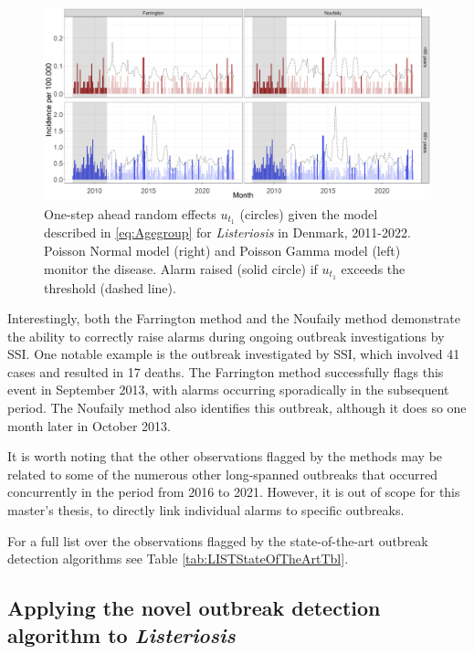 \documentclass[a4paper,twoside,11pt]{report} %
\theoremstyle{definition}
\theoremstyle{definition}
\theoremstyle{definition}
\theoremstyle{definition}
\theoremstyle{remark}
\begin{document}
\begin{figure}[H]
\includegraphics[width=1\linewidth]{../figures/Compare_stateOfTheArt_LIST} \caption{One-step ahead random effects \(u_{t_1}\) (circles) given the model described in \eqref{eq:Agegroup} for \textit{Listeriosis} in Denmark, 2011-2022. Poisson Normal model (right) and Poisson Gamma model (left) monitor the disease. Alarm raised (solid circle) if \(u_{t_1}\) exceeds the threshold (dashed line).}\label{fig:CompareStateOfTheArtLIST}
\end{figure}

Interestingly, both the Farrington method and the Noufaily method demonstrate the ability to correctly raise alarms during ongoing outbreak investigations by SSI. One notable example is the outbreak investigated by SSI, which involved 41 cases and resulted in 17 deaths. The Farrington method successfully flags this event in September 2013, with alarms occurring sporadically in the subsequent period. The Noufaily method also identifies this outbreak, although it does so one month later in October 2013.

It is worth noting that the other observations flagged by the methods may be related to some of the numerous other long-spanned outbreaks that occurred concurrently in the period from 2016 to 2021. However, it is out of scope for this master's thesis, to directly link individual alarms to specific outbreaks.

For a full list over the observations flagged by the state-of-the-art outbreak detection algorithms see Table \ref{tab:LISTStateOfTheArtTbl}.

\subsection{Applying the novel outbreak detection algorithm to \textit{Listeriosis}}
\end{document}
